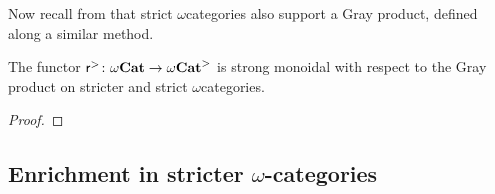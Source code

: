 Now recall from \cite[Appendice A]{ara2020joint} that strict \( \omega \)\nbd categories also support a Gray product, defined along a similar method.

\begin{prop}
    The functor \( \mathsf{r}^{>} \colon {\omega\mathbf{Cat}} \to {\omega\mathbf{Cat}}^> \) is strong monoidal with respect to the Gray product on stricter and strict \( \omega \)\nbd categories.
\end{prop}
\begin{proof}
\end{proof}

\subsection{Enrichment in stricter \texorpdfstring{$\omega$}{}-categories}


